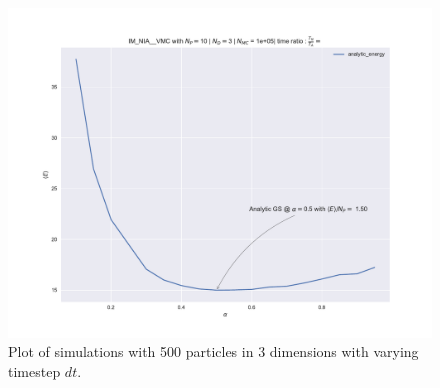 \begin{figure}
\hspace{-2.8cm}
\includegraphics[width = \paperwidth]{figures/c_figs/IM_NIA_np_10_nd_3_dt_01_check.pdf}
\caption{Plot of simulations with 500 particles in 3 dimensions with varying timestep $dt$.}
\label{fig:1c_dt}
\end{figure}

